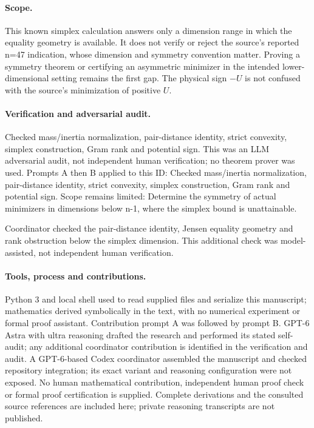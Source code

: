\documentclass[11pt]{article}
\begin{document}
\paragraph{Scope.}This known simplex calculation answers only a dimension range in which the equality geometry is available. It does not verify or reject the source's reported n=47 indication, whose dimension and symmetry convention matter. Proving a symmetry theorem or certifying an asymmetric minimizer in the intended lower-dimensional setting remains the first gap. The physical sign \(-U\) is not confused with the source's minimization of positive \(U\).

\paragraph{Verification and adversarial audit.}
Checked mass/inertia normalization, pair-distance identity, strict convexity, simplex construction, Gram rank and potential sign. This was an LLM adversarial audit, not independent human verification; no theorem prover was used. Prompts A then B applied to this ID: Checked mass/inertia normalization, pair-distance identity, strict convexity, simplex construction, Gram rank and potential sign. Scope remains limited: Determine the symmetry of actual minimizers in dimensions below n-1, where the simplex bound is unattainable.

Coordinator checked the pair-distance identity, Jensen equality geometry and rank obstruction below the simplex dimension. This additional check was model-assisted, not independent human verification.

\paragraph{Tools, process and contributions.}
Python 3 and local shell used to read supplied files and serialize this manuscript; mathematics derived symbolically in the text, with no numerical experiment or formal proof assistant. Contribution prompt A was followed by prompt B. GPT-6 Astra with ultra reasoning drafted the research and performed its stated self-audit; any additional coordinator contribution is identified in the verification and audit. A GPT-6-based Codex coordinator assembled the manuscript and checked repository integration; its exact variant and reasoning configuration were not exposed. No human mathematical contribution, independent human proof check or formal proof certification is supplied. Complete derivations and the consulted source references are included here; private reasoning transcripts are not published.
\end{document}
